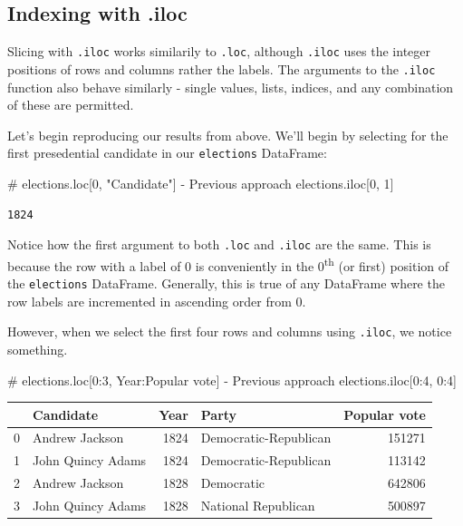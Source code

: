 \documentclass[
  letterpaper,
  DIV=11,
  numbers=noendperiod]{scrreprt}
\newenvironment{Shaded}{\begin{snugshade}}{\end{snugshade}}
\newcommand{\CommentTok}[1]{\textcolor[rgb]{0.37,0.37,0.37}{#1}}
\newcommand{\DecValTok}[1]{\textcolor[rgb]{0.68,0.00,0.00}{#1}}
\newcommand{\NormalTok}[1]{\textcolor[rgb]{0.00,0.23,0.31}{#1}}
\begin{document}
\hypertarget{indexing-with-.iloc}{%
\subsection{Indexing with .iloc}\label{indexing-with-.iloc}}

Slicing with \texttt{.iloc} works similarily to \texttt{.loc}, although
\texttt{.iloc} uses the integer positions of rows and columns rather the
labels. The arguments to the \texttt{.iloc} function also behave
similarly - single values, lists, indices, and any combination of these
are permitted.

Let's begin reproducing our results from above. We'll begin by selecting
for the first presedential candidate in our \texttt{elections}
DataFrame:

\begin{Shaded}
\begin{Highlighting}[]
\CommentTok{\# elections.loc[0, "Candidate"] {-} Previous approach}
\NormalTok{elections.iloc[}\DecValTok{0}\NormalTok{, }\DecValTok{1}\NormalTok{]}
\end{Highlighting}
\end{Shaded}

\begin{verbatim}
1824
\end{verbatim}

Notice how the first argument to both \texttt{.loc} and \texttt{.iloc}
are the same. This is because the row with a label of 0 is conveniently
in the 0\textsuperscript{th} (or first) position of the
\texttt{elections} DataFrame. Generally, this is true of any DataFrame
where the row labels are incremented in ascending order from 0.

However, when we select the first four rows and columns using
\texttt{.iloc}, we notice something.

\begin{Shaded}
\begin{Highlighting}[]
\CommentTok{\# elections.loc[0:3, \textquotesingle{}Year\textquotesingle{}:\textquotesingle{}Popular vote\textquotesingle{}] {-} Previous approach}
\NormalTok{elections.iloc[}\DecValTok{0}\NormalTok{:}\DecValTok{4}\NormalTok{, }\DecValTok{0}\NormalTok{:}\DecValTok{4}\NormalTok{]}
\end{Highlighting}
\end{Shaded}

\begin{tabular}{llrlr}
\toprule
{} &          Candidate &  Year &                  Party &  Popular vote \\
\midrule
0 &     Andrew Jackson &  1824 &  Democratic-Republican &        151271 \\
1 &  John Quincy Adams &  1824 &  Democratic-Republican &        113142 \\
2 &     Andrew Jackson &  1828 &             Democratic &        642806 \\
3 &  John Quincy Adams &  1828 &    National Republican &        500897 \\
\bottomrule
\end{tabular}
\end{document}
